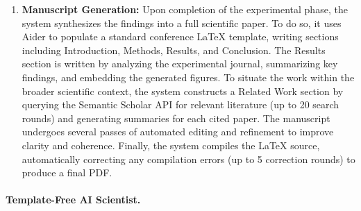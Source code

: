 \begin{enumerate}
    \item \textbf{Manuscript Generation:} Upon completion of the experimental phase, the system synthesizes the findings into a full scientific paper. To do so, it uses Aider to populate
    a standard conference \LaTeX{} template, writing sections including Introduction, Methods, Results, and Conclusion. The Results section is written by analyzing the experimental journal, summarizing key findings, and embedding the generated figures. To situate the work within the broader scientific context, the system constructs a Related Work section by querying the Semantic Scholar API for relevant literature (up to 20 search rounds) and generating summaries for each cited paper. The manuscript undergoes several passes of automated editing and refinement to improve clarity and coherence. Finally, the system compiles the \LaTeX{} source, automatically correcting any compilation errors (up to 5 correction rounds) to produce a final PDF.
\end{enumerate}

\paragraph{Template-Free AI Scientist.}
\label{subsec:template-free-method}

